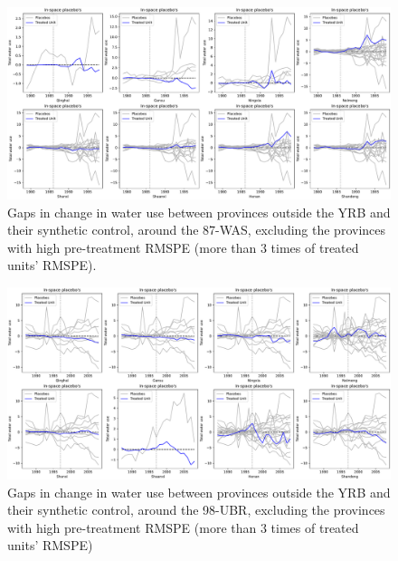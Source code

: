 \documentclass[default, sn-standardnature]{sn-jnl} %
\begin{document}
\begin{figure}
    \includegraphics[width=0.9\linewidth]{outputs/87placebo.pdf}
    \centering
    \caption{Gaps in change in water use between provinces outside the YRB and their synthetic control, around the 87-WAS, excluding the provinces with high pre-treatment RMSPE (more than $3$ times of treated units' RMSPE).}
    \label{fig:87placebo}
\end{figure}

\begin{figure}
    \includegraphics[width=0.9\linewidth]{outputs/98placebo.pdf}
    \centering
    \caption{Gaps in change in water use between provinces outside the YRB and their synthetic control, around the 98-UBR, excluding the provinces with high pre-treatment RMSPE (more than $3$ times of treated units' RMSPE)}
    \label{fig:98placebo}
\end{figure}
\end{document}
